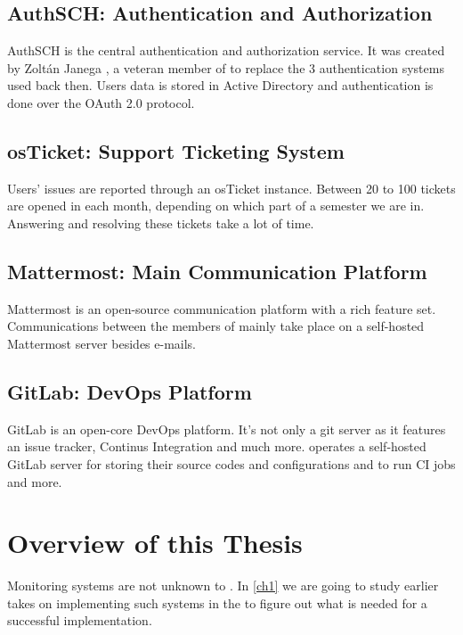 \subsection{AuthSCH: Authentication and Authorization}

AuthSCH is the central authentication and authorization service. It was created
by Zoltán Janega \cite{ZolijBsc}, a veteran member of \kszk to replace the 3
authentication systems used back then. Users data is stored in Active Directory
and authentication is done over the OAuth 2.0 protocol.

\subsection{osTicket: Support Ticketing System}

Users' issues are reported through an osTicket instance. Between 20 to 100
tickets are opened in each month, depending on which part of a semester we are
in. Answering and resolving these tickets take a lot of time.

\subsection{Mattermost: Main Communication Platform}

Mattermost is an open-source communication platform with a rich feature set.
Communications between the members of \kszk mainly take place on a self-hosted
Mattermost server besides e-mails.

\subsection{GitLab: DevOps Platform}

GitLab is an open-core DevOps platform. It's not only a git server as it
features an issue tracker, Continus Integration and much more. \kszk operates a
self-hosted GitLab server for storing their source codes and configurations and
to run CI jobs and more.

\section{Overview of this Thesis}

Monitoring systems are not unknown to \kszk. In \autoref{ch1} we are going to
study earlier takes on implementing such systems in the \sch to figure out what
is needed for a successful implementation.

